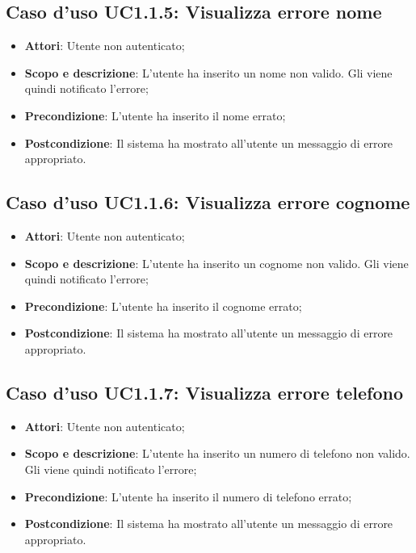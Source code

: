 \documentclass[12pt,a4paper,titlepage]{article}
\begin{document}
	\subsection{Caso d'uso UC1.1.5: Visualizza errore nome}
	\label{UC1.1.5}
	\begin{itemize}
		\item \textbf{Attori}: Utente non autenticato;
		\item \textbf{Scopo e descrizione}: L'utente ha inserito un nome non valido. Gli viene quindi notificato l'errore;
		\item \textbf{Precondizione}: L'utente ha inserito il nome errato;
		\item \textbf{Postcondizione}: Il sistema ha mostrato all'utente un messaggio di errore appropriato.
	\end{itemize}
	\subsection{Caso d'uso UC1.1.6: Visualizza errore cognome}
	\label{UC1.1.6}
	\begin{itemize}
		\item \textbf{Attori}: Utente non autenticato;
		\item \textbf{Scopo e descrizione}: L'utente ha inserito un cognome non valido. Gli viene quindi notificato l'errore;
		\item \textbf{Precondizione}: L'utente ha inserito il cognome errato;
		\item \textbf{Postcondizione}: Il sistema ha mostrato all'utente un messaggio di errore appropriato.
	\end{itemize}
	\subsection{Caso d'uso UC1.1.7: Visualizza errore telefono}
	\label{UC1.1.7}
	\begin{itemize}
		\item \textbf{Attori}: Utente non autenticato;
		\item \textbf{Scopo e descrizione}: L'utente ha inserito un numero di telefono non valido. Gli viene quindi notificato l'errore;
		\item \textbf{Precondizione}: L'utente ha inserito il numero di telefono errato;
		\item \textbf{Postcondizione}: Il sistema ha mostrato all'utente un messaggio di errore appropriato.
	\end{itemize}
\end{document}
